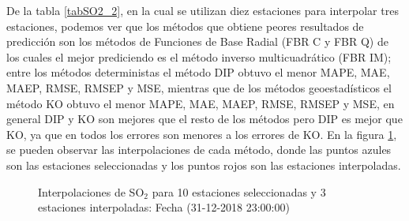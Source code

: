 De la tabla \ref{tabSO2_2}, en la cual se utilizan diez estaciones para interpolar tres estaciones, podemos ver que los métodos que obtiene peores resultados de predicción son los métodos de Funciones de Base Radial (FBR C y FBR Q) de los cuales el mejor prediciendo es el método inverso multicuadrático (FBR IM); entre los métodos deterministas el método DIP obtuvo el menor MAPE, MAE, MAEP, RMSE, RMSEP y MSE, mientras que de los métodos geoestadísticos el método KO obtuvo el menor MAPE, MAE, MAEP, RMSE, RMSEP y MSE, en general DIP y KO son mejores que el resto de los métodos pero DIP es mejor que KO, ya que en todos los errores son menores a los errores de KO. En la figura \ref{SO2figure2}, se pueden observar las interpolaciones de cada método, donde las puntos azules son las estaciones seleccionadas y los puntos rojos son las estaciones interpoladas.


\begin{figure}[H]
\centering
{}
\subfigure[KO] {\texttt{[image: ./ok\_10\_7\_26302]}}
\subfigure[KU] {\texttt{[image: ./uk\_10\_7\_26302]}}
\caption{Interpolaciones de SO$_{2}$ para 10 estaciones seleccionadas y 3 estaciones interpoladas: Fecha (31-12-2018 23:00:00)}
\label{SO2figure2}
\end{figure}


